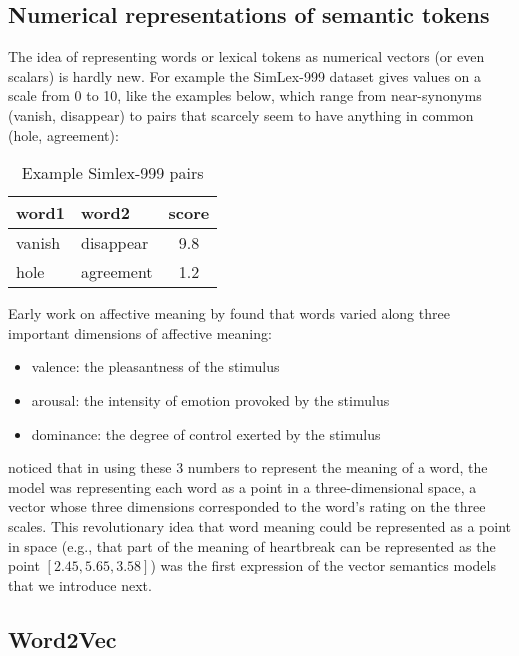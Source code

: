 \subsection{Numerical representations of semantic tokens}
The idea of representing words or lexical tokens as numerical vectors (or even scalars) is hardly new. 
For example the SimLex-999 dataset \citep*{hill-etal-2015-simlex} gives values on a scale from 0 to 10, like the examples below, which range from near-synonyms (vanish, disappear) to pairs that scarcely seem to have anything in common (hole, agreement):

\begin{table}[htbp]
    \centering
        \begin{tabular}{llc}
            \toprule
            word1 & word2 & score \\
            \midrule
            vanish & disappear & 9.8 \\
            hole & agreement & 1.2 \\
            \bottomrule
       \end{tabular}
    \caption{Example Simlex-999 pairs}
    \label{simlex2pairs}
\end{table}


Early work on affective meaning by \cite{osgood1957measurement} found that words varied along three important dimensions of affective meaning:
\begin{itemize}
    \item valence: the pleasantness of the stimulus
    \item arousal: the intensity of emotion provoked by the stimulus
    \item dominance: the degree of control exerted by the stimulus
\end{itemize}

\cite{osgood1957measurement} noticed that in using these 3 numbers to represent the meaning of a word, the model was representing each word as a point in a three-dimensional space, a vector whose three dimensions corresponded to the word’s rating on the three scales. This revolutionary idea that word meaning could be represented as a point in space (e.g., that part of the meaning of heartbreak can be represented as the point $[2.45,5.65,3.58]$) was the first expression of the vector semantics models that we introduce next. 

\subsection*{Word2Vec}

